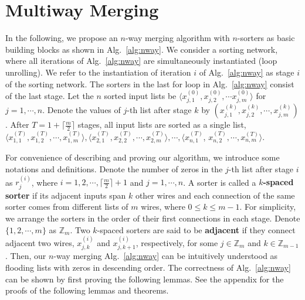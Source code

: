 \documentclass[10pt,journal,cspaper,compsoc]{IEEEtran}
\begin{document}
\section{Multiway Merging}
\label{sec:kmerge}
In the following, we propose an $n$-way merging algorithm with $n$-sorters as basic building blocks as shown in Alg.~\ref{alg:nway}.
We consider a sorting network, where all iterations of Alg.~\ref{alg:nway} are simultaneously instantiated (loop unrolling). We refer to the instantiation of iteration $i$ of Alg.~\ref{alg:nway} as stage $i$ of the sorting network.
The sorters in the last for loop in Alg.~\ref{alg:nway} consist of the last stage.
Let the $n$ sorted input lists be $\langle x^{(0)}_{j,1}, x^{(0)}_{j,2}, \cdots x^{(0)}_{j,m} \rangle$ for $j=1,\cdots,n$. Denote the values of $j$-th list after stage $k$ by $(x^{(k)}_{j,1}, x^{(k)}_{j,2},\cdots, x^{(k)}_{j,m})$. After $T=1+\lceil \frac{m}{2} \rceil$ stages, all input lists are sorted as a single list, $\langle x^{(T)}_{1,1}, x^{(T)}_{1,2},\cdots, x^{(T)}_{1,m} \rangle, \langle x^{(T)}_{2,1}, x^{(T)}_{2,2},\cdots, x^{(T)}_{2,m} \rangle, \cdots, \langle x^{(T)}_{n,1}$, $x^{(T)}_{n,2},\cdots, x^{(T)}_{n,m} \rangle$.


For convenience of describing and proving our algorithm, we introduce some notations and definitions. Denote the number of zeros in the $j$-th list after stage $i$ as $r^{(i)}_j$, where $i=1,2,\cdots, \lceil \frac{m}{2}\rceil + 1$ and $j=1,\cdots,n$. A sorter is called a \textbf{$k$-spaced sorter} if its adjacent inputs span $k$ other wires and each connection of the same sorter comes from different lists of $m$ wires, where $0 \le k \le m-1$. For simplicity, we arrange the sorters in the order of their first connections in each stage. Denote $\{1,2,\cdots,m\}$ as $\mathbb{Z}_m$. Two $k$-spaced sorters are said to be \textbf{adjacent} if they connect adjacent two wires, $x^{(i)}_{j,k}$ and $x^{(i)}_{j,k+1}$, respectively, for some $j \in \mathbb{Z}_m$ and $k \in \mathbb{Z}_{m-1}$.
Then, our $n$-way merging Alg.~\ref{alg:nway} can be intuitively understood as flooding lists with zeros in descending order. The correctness of Alg.~\ref{alg:nway} can be shown by first proving the following lemmas. See the appendix for the proofs of the following lemmas and theorems.
\end{document}
